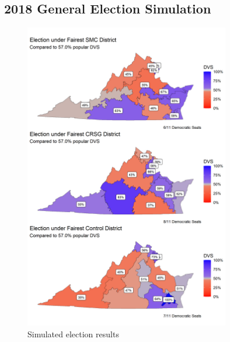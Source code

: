 \subsection{2018 General Election Simulation}
\begin{figure}
    \centering
    \includegraphics[width=0.8\textwidth]{img/election.map.png}
    \caption{Simulated election results}
    \label{fig:election.map}
\end{figure}

